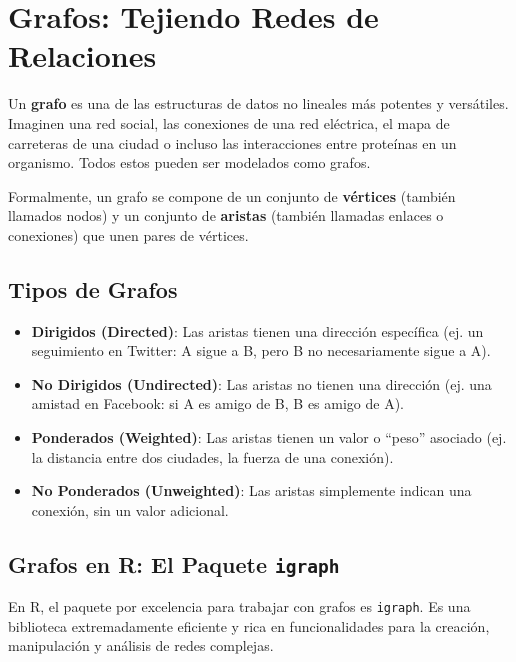 \documentclass[
  spanish,
  letterpaper,
  DIV=11,
  numbers=noendperiod]{scrreprt}
\providecommand{\tightlist}{%
  \setlength{\itemsep}{0pt}\setlength{\parskip}{0pt}}
\begin{document}
\section{Grafos: Tejiendo Redes de
Relaciones}\label{grafos-tejiendo-redes-de-relaciones}

Un \textbf{grafo} es una de las estructuras de datos no lineales más
potentes y versátiles. Imaginen una red social, las conexiones de una
red eléctrica, el mapa de carreteras de una ciudad o incluso las
interacciones entre proteínas en un organismo. Todos estos pueden ser
modelados como grafos.

Formalmente, un grafo se compone de un conjunto de \textbf{vértices}
(también llamados nodos) y un conjunto de \textbf{aristas} (también
llamadas enlaces o conexiones) que unen pares de vértices.

\subsection{Tipos de Grafos}\label{tipos-de-grafos}

\begin{itemize}
\tightlist
\item
  \textbf{Dirigidos (Directed)}: Las aristas tienen una dirección
  específica (ej. un seguimiento en Twitter: A sigue a B, pero B no
  necesariamente sigue a A).
\item
  \textbf{No Dirigidos (Undirected)}: Las aristas no tienen una
  dirección (ej. una amistad en Facebook: si A es amigo de B, B es amigo
  de A).
\item
  \textbf{Ponderados (Weighted)}: Las aristas tienen un valor o ``peso''
  asociado (ej. la distancia entre dos ciudades, la fuerza de una
  conexión).
\item
  \textbf{No Ponderados (Unweighted)}: Las aristas simplemente indican
  una conexión, sin un valor adicional.
\end{itemize}

\subsection{\texorpdfstring{Grafos en R: El Paquete
\texttt{igraph}}{Grafos en R: El Paquete igraph}}\label{grafos-en-r-el-paquete-igraph}

En R, el paquete por excelencia para trabajar con grafos es
\texttt{igraph}. Es una biblioteca extremadamente eficiente y rica en
funcionalidades para la creación, manipulación y análisis de redes
complejas.
\end{document}
